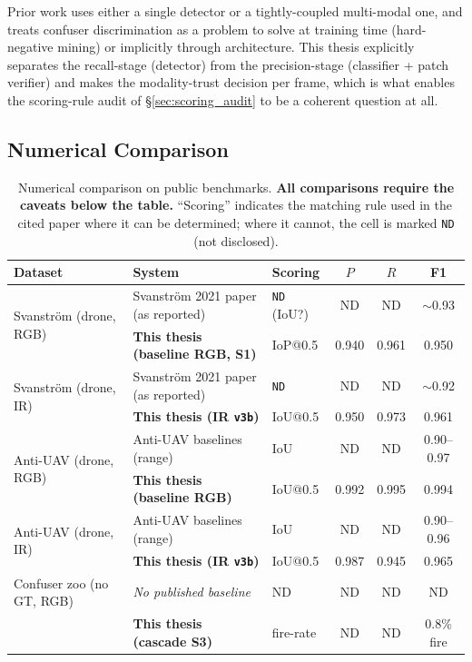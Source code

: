\documentclass[12pt,a4paper,oneside,openright]{book}
\begin{document}
Prior work uses either a single detector or a tightly-coupled multi-modal one, and treats confuser discrimination as a problem to solve at training time (hard-negative mining) or implicitly through architecture. This thesis explicitly separates the recall-stage (detector) from the precision-stage (classifier + patch verifier) and makes the modality-trust decision per frame, which is what enables the scoring-rule audit of \S\ref{sec:scoring_audit} to be a coherent question at all.

\subsection{Numerical Comparison}

\begin{table}[htbp]
    \centering
    \caption{Numerical comparison on public benchmarks. \textbf{All comparisons require the caveats below the table.} ``Scoring'' indicates the matching rule used in the cited paper where it can be determined; where it cannot, the cell is marked \texttt{ND} (not disclosed).}
    \label{tab:numerical_comparison}
    \begin{tabular}{lllccc}
        \toprule
        Dataset & System & Scoring & $P$ & $R$ & F1 \\
        \midrule
        \multirow{2}{*}{Svanstr\"om (drone, RGB)} & Svanstr\"om 2021 paper (as reported) & \texttt{ND} (IoU?) & ND & ND & $\sim$0.93 \\
                                                   & \textbf{This thesis (baseline RGB, S1)} & IoP@0.5 & 0.940 & 0.961 & 0.950 \\
        \midrule
        \multirow{2}{*}{Svanstr\"om (drone, IR)}  & Svanstr\"om 2021 paper (as reported) & \texttt{ND} & ND & ND & $\sim$0.92 \\
                                                   & \textbf{This thesis (IR \texttt{v3b})} & IoU@0.5 & 0.950 & 0.973 & 0.961 \\
        \midrule
        \multirow{2}{*}{Anti-UAV (drone, RGB)}    & Anti-UAV baselines (range) & IoU & ND & ND & 0.90--0.97 \\
                                                   & \textbf{This thesis (baseline RGB)} & IoU@0.5 & 0.992 & 0.995 & 0.994 \\
        \midrule
        \multirow{2}{*}{Anti-UAV (drone, IR)}     & Anti-UAV baselines (range) & IoU & ND & ND & 0.90--0.96 \\
                                                   & \textbf{This thesis (IR \texttt{v3b})} & IoU@0.5 & 0.987 & 0.945 & 0.965 \\
        \midrule
        Confuser zoo (no GT, RGB)                  & \emph{No published baseline} & ND & ND & ND & ND \\
                                                   & \textbf{This thesis (cascade S3)} & fire-rate & ND & ND & 0.8\% fire \\
        \bottomrule
    \end{tabular}
\end{table}
\end{document}
